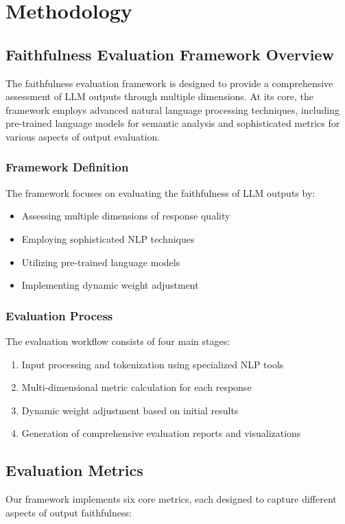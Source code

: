 \section{Methodology}

\subsection{Faithfulness Evaluation Framework Overview}
The faithfulness evaluation framework is designed to provide a comprehensive assessment of LLM outputs through multiple dimensions. At its core, the framework employs advanced natural language processing techniques, including pre-trained language models for semantic analysis and sophisticated metrics for various aspects of output evaluation.

\subsubsection{Framework Definition}
The framework focuses on evaluating the faithfulness of LLM outputs by:
\begin{itemize}
    \item Assessing multiple dimensions of response quality
    \item Employing sophisticated NLP techniques
    \item Utilizing pre-trained language models
    \item Implementing dynamic weight adjustment
\end{itemize}

\subsubsection{Evaluation Process}
The evaluation workflow consists of four main stages:
\begin{enumerate}
    \item Input processing and tokenization using specialized NLP tools
    \item Multi-dimensional metric calculation for each response
    \item Dynamic weight adjustment based on initial results
    \item Generation of comprehensive evaluation reports and visualizations
\end{enumerate}

\subsection{Evaluation Metrics}
Our framework implements six core metrics, each designed to capture different aspects of output faithfulness:

